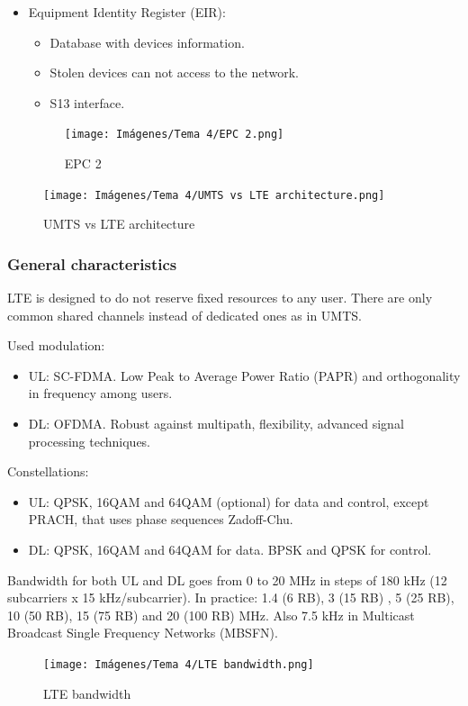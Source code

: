 \documentclass[
	12pt,
	twoside
]{book}
\begin{document}
\begin{itemize}
{\begin{itemize}
{\begin{itemize}
				\end{itemize}
			}
			\item {
				Equipment Identity Register (EIR):
				\begin{itemize}
					\item Database with devices information.
					\item Stolen devices can not access to the network.
					\item S13 interface.
				\end{itemize}
				\begin{figure}[H]
					\centering
					\texttt{[image: Imágenes/Tema 4/EPC 2.png]}
					\caption{
						\label{fig:unit4_LTE_EPC2}
						EPC 2
					}
				\end{figure}
			}
		\end{itemize}
	}
\end{itemize}

\begin{figure}[H]
	\centering
	\texttt{[image: Imágenes/Tema 4/UMTS vs LTE architecture.png]}
	\caption{
		\label{fig:unit4_UMTS_vs_LTE}
		UMTS vs LTE architecture
	}
\end{figure}

\subsubsection{General characteristics}

LTE is designed to do not reserve fixed resources to any user. There are only common shared channels instead of dedicated ones as in UMTS.

Used modulation:
\begin{itemize}
	\item UL: SC-FDMA. Low Peak to Average Power Ratio (PAPR) and orthogonality in frequency among users.
	\item DL: OFDMA. Robust against multipath, flexibility, advanced signal processing techniques.
\end{itemize}

Constellations:
\begin{itemize}
	\item UL: QPSK, 16QAM and 64QAM (optional) for data and control, except PRACH, that uses phase sequences Zadoff-Chu.
	\item DL: QPSK, 16QAM and 64QAM for data. BPSK and QPSK for control.
\end{itemize}

Bandwidth for both UL and DL goes from 0 to 20 MHz in steps of 180 kHz (12 subcarriers x 15 kHz/subcarrier). In practice: 1.4 (6 RB), 3 (15 RB) , 5 (25 RB), 10 (50 RB), 15 (75 RB) and 20 (100 RB) MHz. Also 7.5 kHz in Multicast Broadcast Single Frequency Networks (MBSFN).
\begin{figure}[H]
	\centering
	\texttt{[image: Imágenes/Tema 4/LTE bandwidth.png]}
	\caption{
		\label{fig:unit4_LTE_BW}
		LTE bandwidth
	}
\end{figure}
\end{document}
